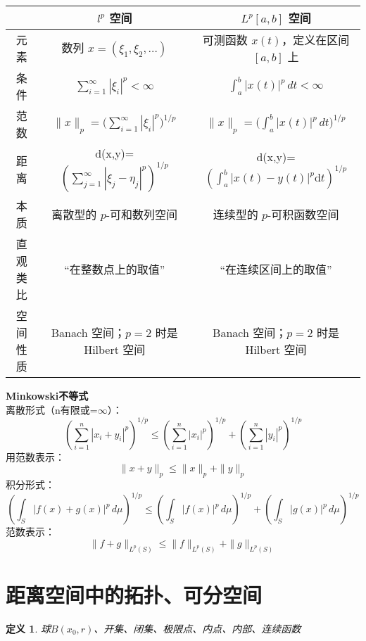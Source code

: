 \documentclass[12pt, a4paper, oneside, fontset=windows]{ctexbook}
\newtheorem{definition}{定义}[section]
\begin{document}
    \begin{table}[h]
        \centering
        \begin{tabular}{|c|c|c|}
        \hline
        & $l^p$ 空间 & $L^p[a,b]$ 空间 \\
        \hline
        元素 & 数列 $x=(\xi_1,\xi_2,\dots)$ & 可测函数 $x(t)$，定义在区间 $[a,b]$ 上 \\
        \hline
        条件 & $\displaystyle \sum_{i=1}^\infty |\xi_i|^p < \infty$ & $\displaystyle \int_a^b |x(t)|^p \, dt < \infty$ \\
        \hline
        范数 & $\displaystyle \|x\|_p = \Big(\sum_{i=1}^\infty |\xi_i|^p\Big)^{1/p}$ & $\displaystyle \|x\|_p = \Big(\int_a^b |x(t)|^p \, dt\Big)^{1/p}$ \\
        \hline
        距离 & d(x,y)=$\displaystyle (\sum_{j=1}^{\infty}|\xi_j - \eta_j|^p)^{1/ p}$ & d(x,y)=$\displaystyle (\int_{a}^{b}|x(t)-y(t)|^p \mathrm{d}t )^{1/p}$\\
        \hline
        本质 & 离散型的 $p$-可和数列空间 & 连续型的 $p$-可积函数空间 \\
        \hline
        直观类比 & “在整数点上的取值” & “在连续区间上的取值” \\
        \hline
        空间性质 & Banach 空间；$p=2$ 时是 Hilbert 空间 & Banach 空间；$p=2$ 时是 Hilbert 空间 \\
        \hline
        \end{tabular}
    \end{table}


    \begin{tcolorbox}
        \textbf{Minkowski不等式}\\
        离散形式（n有限或=$\infty$）：
        \[\left( \sum_{i=1}^{n} |x_i + y_i|^p \right)^{1/p} \le \left( \sum_{i=1}^{n} |x_i|^p \right)^{1/p} + \left( \sum_{i=1}^{n} |y_i|^p \right)^{1/p}\] 
            用范数表示：
            \[ \|x+y\|_p \le \|x\|_p + \|y\|_p\]
        积分形式：
        \[\left( \int_S |f(x) + g(x)|^p \,d\mu \right)^{1/p} \le \left( \int_S |f(x)|^p \,d\mu \right)^{1/p} + \left( \int_S |g(x)|^p \,d\mu \right)^{1/p}\]
            范数表示：
            \[\|f+g\|_{L^p(S)} \le \|f\|_{L^p(S)} + \|g\|_{L^p(S)}\]
    \end{tcolorbox}

    \section{距离空间中的拓扑、可分空间}
    \begin{definition}
        球$B(x_0,r)$、开集、闭集、极限点、内点、内部、连续函数
    \end{definition}
\end{document}
